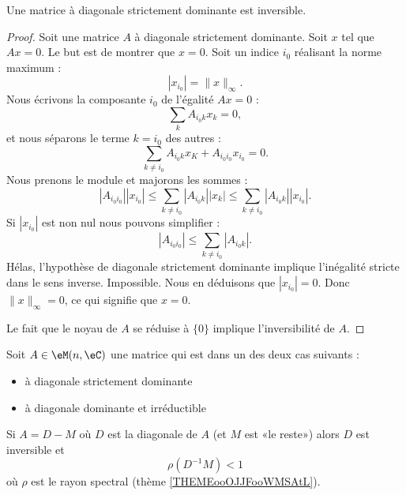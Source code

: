 \begin{proposition}
    Une matrice à diagonale strictement dominante est inversible.
\end{proposition}

\begin{proof}
    Soit une matrice \( A\) à diagonale strictement dominante. Soit \( x\) tel que \( Ax=0\). Le but est de montrer que \( x=0\). Soit un indice \( i_0\) réalisant la norme maximum :
    \begin{equation}
        | x_{i_0} |=\| x \|_{\infty}.
    \end{equation}
    Nous écrivons la composante \( i_0\) de l'égalité \( Ax=0\) : 
    \begin{equation}
        \sum_kA_{i_0k}x_k=0,
    \end{equation}
    et nous séparons le terme \( k=i_0\) des autres :
    \begin{equation}
        \sum_{k\neq i_0}A_{i_0k}x_K+A_{i_0i_0}x_{i_0}=0.
    \end{equation}
    Nous prenons le module et majorons les sommes :
    \begin{equation}
        | A_{i_0i_0} | |x_{i_0} |\leq \sum_{k\neq i_0}| A_{i_0k} | |x_k |\leq \sum_{k\neq i_0}| A_{i_0k} | |x_{i_0} |.
    \end{equation}
    Si \( | x_{i_0} | \) est non nul nous pouvons simplifier :
    \begin{equation}
        | A_{i_0i_0} |\leq \sum_{k\neq i_0}| A_{i_0k} |.
    \end{equation}
    Hélas, l'hypothèse de diagonale strictement dominante implique l'inégalité stricte dans le sens inverse. Impossible. Nous en déduisons que \( | x_{i_0} |=0\). Donc \( \| x \|_{\infty}=0\), ce qui signifie que \( x=0\).

    Le fait que le noyau de \( A\) se réduise à \( \{ 0 \}\) implique l'inversibilité de \( A\).
\end{proof}

\begin{proposition}
    Soit \( A\in \eM(n,\eC)\) une matrice qui est dans un des deux cas suivants :
    \begin{itemize}
        \item à diagonale strictement dominante
        \item à diagonale dominante et irréductible
    \end{itemize}
    Si \( A=D-M\) où \( D\) est la diagonale de \( A\) (et \( M\) est «le reste») alors \( D\) est inversible et
    \begin{equation}
        \rho(D^{-1}M)<1
    \end{equation}
    où \( \rho\) est le rayon spectral (thème \ref{THEMEooOJJFooWMSAtL}).
\end{proposition}

